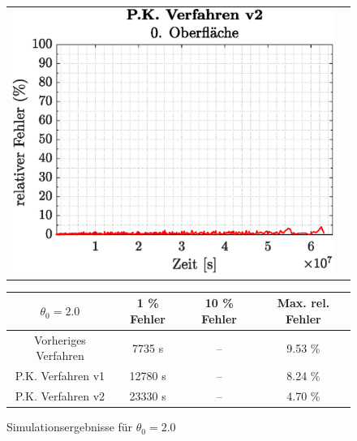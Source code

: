 \documentclass{listhesis}
\begin{document}
\begin{figure}[!h]
\begin{tabular}{@{}cc@{}}
\includegraphics[width=\ws\textwidth]{./include/figure_2.0/PC_new/CovFacetError0.eps}
\end{tabular}
\newline
\vspace*{0.5cm}
\newline
\begin{tabular}{|c|c|c|c|}
\hline
$\theta_0 = 2.0$ & 1 \% Fehler & 10 \% Fehler & Max. rel. Fehler\\
\hline
Vorheriges Verfahren & 7735 s & -- & 9.53 \% \\
P.K. Verfahren v1 & 12780 s & -- & 8.24 \% \\
P.K. Verfahren v2 & 23330 s & -- & 4.70 \% \\
\hline
\end{tabular}
\caption{Simulationsergebnisse für $\theta_0 = 2.0$}
\label{fig:figure_2.0}
\end{figure}

\end{document}
